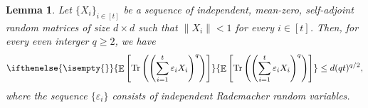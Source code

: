 \documentclass[11pt,letterpaper]{article}
\newtheorem{lemma}[theorem]{Lemma}
\DeclareMathOperator*{\E}{\mathbb{E}}
\DeclareMathOperator*{\Tr}{Tr}
\newcommand{\eps}{\varepsilon}
\newcommand{\1}{\mathbbm{1}}
\newcommand{\norm}[1]{\left\lVert #1\right\rVert}
\newcommand{\tuple}[1]{\left(#1\right)}
\newcommand{\Ex}[2][]{ \ifthenelse{\isempty{#1}}
  {\E\left[#2\right]}
  {\E_{#1}\left[#2\right]} }
\begin{document}


\begin{lemma}
\label{lem:bound_with_Rad}
Let $\{X_i\}_{i \in [t]}$ be a sequence of independent, mean-zero, self-adjoint random matrices of size $d \times d$ such that $\|X_i\| < 1$ for every $i \in [t]$. Then, for every even interger $q \ge 2$, we have
\[
    \Ex{\Tr \tuple{\tuple{\sum_{i=1}^t \eps_i X_i}^q}} \le d (qt)^{q / 2},
\]
where the sequence $\{\eps_i\}$ consists of independent Rademacher random variables. 
\end{lemma}
\end{document}
